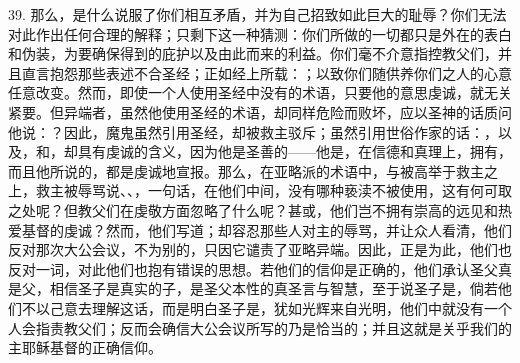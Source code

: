39. 那么，是什么说服了你们相互矛盾，并为自己招致如此巨大的耻辱？你们无法对此作出任何合理的解释；只剩下这一种猜测：你们所做的一切都只是外在的表白和伪装，为要确保得到的庇护以及由此而来的利益。你们毫不介意指控教父们，并且直言抱怨那些表述不合圣经；正如经上所载：；以致你们随供养你们之人的心意任意改变。然而，即使一个人使用圣经中没有的术语，只要他的意思虔诚，就无关紧要。但异端者，虽然他使用圣经的术语，却同样危险而败坏，应以圣神的话质问他说：？因此，魔鬼虽然引用圣经，却被救主驳斥；虽然引用世俗作家的话：，以及，和，却具有虔诚的含义，因为他是圣善的——他是，在信德和真理上，拥有，而且他所说的，都是虔诚地宣报。那么，在亚略派的术语中，与被高举于救主之上，救主被辱骂说、、，一句话，在他们中间，没有哪种亵渎不被使用，这有何可取之处呢？但教父们在虔敬方面忽略了什么呢？甚或，他们岂不拥有崇高的远见和热爱基督的虔诚？然而，他们写道；却容忍那些人对主的辱骂，并让众人看清，他们反对那次大公会议，不为别的，只因它谴责了亚略异端。因此，正是为此，他们也反对一词，对此他们也抱有错误的思想。若他们的信仰是正确的，他们承认圣父真是父，相信圣子是真实的子，是圣父本性的真圣言与智慧，至于说圣子是，倘若他们不以己意去理解这话，而是明白圣子是，犹如光辉来自光明，他们中就没有一个人会指责教父们；反而会确信大公会议所写的乃是恰当的；并且这就是关乎我们的主耶稣基督的正确信仰。\par

